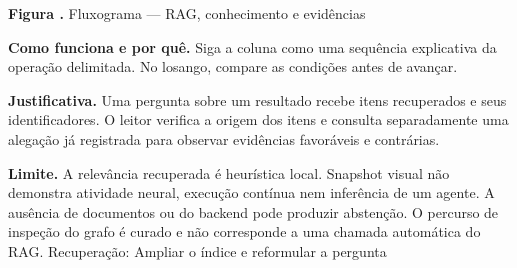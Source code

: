 {\small\textbf{Figura \thefigure.} Fluxograma --- RAG, conhecimento e evidências}\par\smallskip
\noindent\textbf{Como funciona e por quê.} Siga a coluna como uma sequência explicativa da operação delimitada. No losango, compare as condições antes de avançar.\par
\noindent\textbf{Justificativa.} Uma pergunta sobre um resultado recebe itens recuperados e seus identificadores. O leitor verifica a origem dos itens e consulta separadamente uma alegação já registrada para observar evidências favoráveis e contrárias.\par
\noindent\textbf{Limite.} A relevância recuperada é heurística local. Snapshot visual não demonstra atividade neural, execução contínua nem inferência de um agente. A ausência de documentos ou do backend pode produzir abstenção. O percurso de inspeção do grafo é curado e não corresponde a uma chamada automática do RAG. Recuperação: Ampliar o índice e reformular a pergunta\par\smallskip
{}
